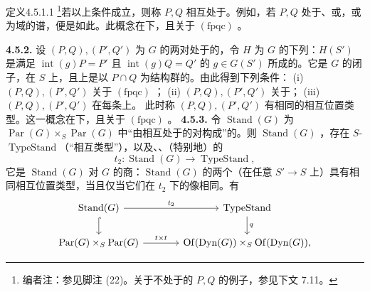 \begin{SGAresult}{定义}{4.5.1.1}
\footnote{编者注：参见脚注 (22)。关于不处于的 $P,Q$ 的例子，参见下文 7.11。}若以上条件成立，则称 $P,Q$ 相互处于。例如，若 $P,Q$ 处于、或，或为域的谱，便是如此。此概念在下，且关于 $(\mathrm{fpqc})$ 。
\end{SGAresult}
\textbf{4.5.2.} 设 $(P,Q),(P',Q')$ 为 $G$ 的两对处于的，令 $H$ 为 $G$ 的下列：$H(S')$ 是满足 $\operatorname{int}(g)P=P'$ 且 $\operatorname{int}(g)Q=Q'$ 的 $g\in G(S')$ 所成的。它是 $G$ 的闭子，在 $S$ 上，且上是以 $P\cap Q$ 为结构群的。由此得到下列条件：
(i) $(P,Q),(P',Q')$ 关于 $(\mathrm{fpqc})$ ；
(ii) $(P,Q),(P',Q')$ 关于；
(iii) $(P,Q),(P',Q')$ 在每条上。
此时称 $(P,Q),(P',Q')$ 有相同的相互位置类型。这一概念在下，且关于 $(\mathrm{fpqc})$ 。
\textbf{4.5.3.} 令 $\operatorname{Stand}(G)$ 为 $\operatorname{Par}(G)\times_S\operatorname{Par}(G)$ 中“由相互处于的对构成”的。则 $\operatorname{Stand}(G)$ ，存在 $S$- $\operatorname{TypeStand}$（“相互类型”），以及、、（特别地）的
\[t_2:\operatorname{Stand}(G)\longrightarrow\operatorname{TypeStand},\]
它是 $\operatorname{Stand}(G)$ 对 $G$ 的商：$\operatorname{Stand}(G)$ 的两个（在任意 $S'\to S$ 上）具有相同相互位置类型，当且仅当它们在 $t_2$ 下的像相同。有
\[\begin{tikzcd}[column sep=large]
\operatorname{Stand}(G)\arrow[r,"t_2"]\arrow[d,hook]&\operatorname{TypeStand}\arrow[d,"q"]\\
\operatorname{Par}(G)\times_S\operatorname{Par}(G)\arrow[r,"t\times t"]&\operatorname{Of}(\operatorname{Dyn}(G))\times_S\operatorname{Of}(\operatorname{Dyn}(G)),
\end{tikzcd}\]
